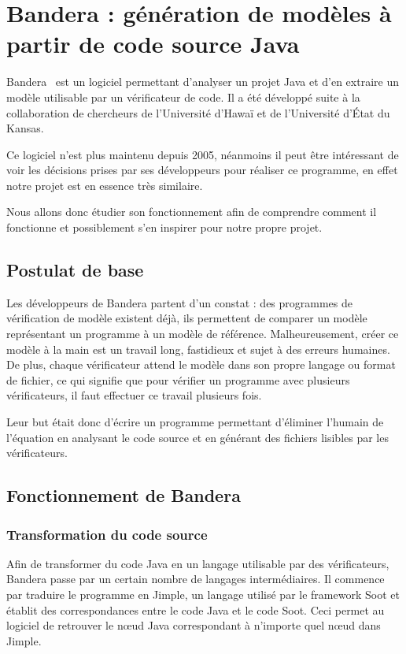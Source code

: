 \chapter{Bandera : génération de modèles à partir de code source Java}

Bandera~\cite{bandera1} est un logiciel permettant d'analyser un
projet Java et d'en extraire un modèle utilisable par un vérificateur
de code. Il a été développé suite à la collaboration de chercheurs de
l'Université d'Hawaï et de l'Université d'État du Kansas.

Ce logiciel n'est plus maintenu depuis 2005, néanmoins il peut être
intéressant de voir les décisions prises par ses développeurs pour
réaliser ce programme, en effet notre projet est en essence très similaire.

Nous allons donc étudier son fonctionnement afin de comprendre comment
il fonctionne et possiblement s'en inspirer pour notre propre projet.

\section{Postulat de base}

Les développeurs de Bandera partent d'un constat : des programmes de
vérification de modèle existent déjà, ils permettent de comparer un
modèle représentant un programme à un modèle de
référence. Malheureusement, créer ce modèle à la main est un travail
long, fastidieux et sujet à des erreurs humaines. De plus, chaque
vérificateur attend le modèle dans son propre langage ou format de
fichier, ce qui signifie que pour vérifier un programme avec plusieurs
vérificateurs, il faut effectuer ce travail plusieurs fois.

Leur but était donc d'écrire un programme permettant d'éliminer
l'humain de l'équation en analysant le code source et en générant des
fichiers lisibles par les vérificateurs.

\section{Fonctionnement de Bandera}

\subsection{Transformation du code source}

Afin de transformer du code Java en un langage utilisable par des
vérificateurs, Bandera passe par un certain nombre de langages
intermédiaires. Il commence par traduire le programme en Jimple, un
langage utilisé par le framework Soot et établit des correspondances
entre le code Java et le code Soot. Ceci permet au logiciel de
retrouver le n\oe{}ud Java correspondant à n'importe quel n\oe{}ud
dans Jimple.

